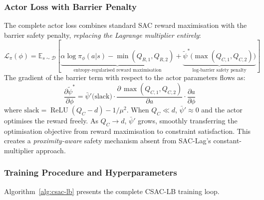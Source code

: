 \subsubsection{Actor Loss with Barrier Penalty}

The complete actor loss combines standard SAC reward maximisation with the
barrier safety penalty, \emph{replacing the Lagrange multiplier entirely}:
\begin{equation}
  \mathcal{L}_\pi(\phi) = \mathbb{E}_{s \sim \mathcal{D}}\!\left[
    \underbrace{\alpha \log \pi_\phi(a|s)
      - \min(Q_{R,1}, Q_{R,2})}_{\text{entropy-regularised reward maximisation}}
    + \underbrace{\tilde{\psi}^*\!\bigl(
      \max(Q_{C,1}, Q_{C,2})\bigr)}_{\text{log-barrier safety penalty}}
  \right]
  \label{eq:csac-loss}
\end{equation}
The gradient of the barrier term with respect to the actor parameters flows as:
\begin{equation}
  \frac{\partial \tilde{\psi}^*}{\partial \phi} =
    \bar{\psi}'\!\bigl(\text{slack}\bigr) \cdot
    \frac{\partial\, \max(Q_{C,1}, Q_{C,2})}{\partial a} \cdot
    \frac{\partial a}{\partial \phi}
  \label{eq:barrier-gradient}
\end{equation}
where $\text{slack} = \operatorname{ReLU}(Q_C - d) - 1/\mu^2$.  When
$Q_C \ll d$, $\bar{\psi}' \approx 0$ and the actor optimises the reward
freely.  As $Q_C \to d$, $\bar{\psi}'$ grows, smoothly transferring the
optimisation objective from reward maximisation to constraint satisfaction.
This creates a \emph{proximity-aware} safety mechanism absent from SAC-Lag's
constant-multiplier approach.

\subsubsection{Training Procedure and Hyperparameters}

Algorithm~\ref{alg:csac-lb} presents the complete CSAC-LB training loop.

